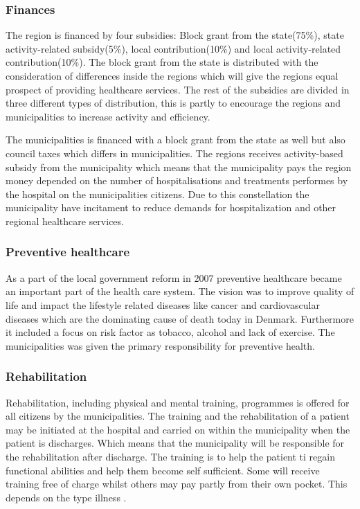 \cite{sundhedsvaesen, sundhedsministeriet}

\subsubsection{Finances}

The region is financed by four subsidies: Block grant from the state(75\%), state activity-related subsidy(5\%), local contribution(10\%) and local activity-related contribution(10\%). The block grant from the state is distributed with the consideration of differences inside the regions which will give the regions equal prospect of providing healthcare services. The rest of the subsidies are divided in three different types of distribution, this is partly to encourage the regions and municipalities to increase activity and efficiency\cite{sundhedsministeriet}.

The municipalities is financed with a block grant from the state as well but also council taxes which differs in municipalities. The regions receives activity-based subsidy from the municipality which means that the municipality pays the region money depended on the number of hospitalisations and treatments performes by the hospital on the municipalities citizens. Due to this constellation the municipality have incitament to reduce demands for hospitalization and other regional healthcare services\cite{Healthcareindk2}.



\subsubsection{Preventive healthcare}

As a part of the local government reform in 2007 preventive healthcare became an important part of the health care system. The vision was to improve quality of life and  impact the lifestyle related diseases like cancer and cardiovascular diseases which are the dominating cause of death today in Denmark. Furthermore it included a focus on risk factor as tobacco, alcohol and lack of exercise. The municipalities was given the primary responsibility for preventive health\cite{sundhedsministeriet}.

\subsubsection{Rehabilitation}

Rehabilitation, including physical and mental training, programmes is offered for all citizens by the municipalities. The training and the rehabilitation of a patient may be initiated at the hospital and carried on within the municipality when the patient is discharges. Which means that the municipality will be responsible for the rehabilitation after discharge. The training is to help the patient ti regain functional abilities and help them become self sufficient. Some will receive training free of charge whilst others may pay partly from their own pocket. This depends on the type illness  \cite{Healthcareindk2}.

